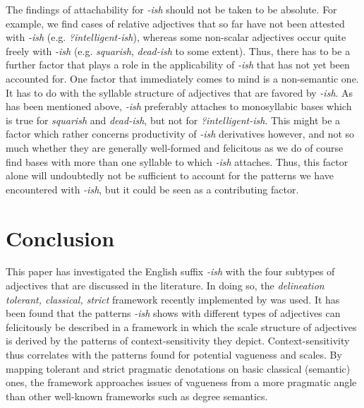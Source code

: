 \documentclass[output=paper]{langsci/langscibook}
\begin{document}
The findings of attachability for \textit{-ish} should not be taken to be absolute. For example, we find cases of relative adjectives that so far have not been attested with \textit{-ish} (e.g. \textit{?intelligent-ish}), whereas some non-scalar adjectives occur quite freely with \textit{-ish} (e.g. \textit{squarish}, \textit{dead-ish} to some extent). Thus, there has to be a further factor that plays a role in the applicability of \textit{-ish} that has not yet been accounted for. One factor that immediately comes to mind is a non-semantic one. It has to do with the syllable structure of adjectives that are favored by \textit{-ish}. As has been mentioned above, \textit{-ish} preferably attaches to monosyllabic bases which is true for \textit{squarish} and \textit{dead-ish}, but not for \textit{?intelligent-ish}. This might be a factor which rather concerns productivity of \textit{-ish} derivatives however, and not so much whether they are generally well-formed and felicitous as we do of course find bases with more than one syllable to which \textit{-ish} attaches. Thus, this factor alone will undoubtedly not be sufficient to account for the patterns we have encountered with \textit{-ish}, but it could be seen as a contributing factor.

\section{Conclusion}
\label{sec:summary}

This paper has investigated the English suffix \textit{-ish} with the four subtypes of adjectives that are discussed in the literature. In doing so, the \textit{delineation tolerant, classical, strict} framework recently implemented by \citet{Burnett2017} was used. It has been found that the patterns \textit{-ish} shows with different types of adjectives can felicitously be described in a framework in which the scale structure of adjectives is derived by the patterns of context-sensitivity they depict. Context-sensitivity thus correlates with the patterns found for potential vagueness and scales. By mapping tolerant and strict pragmatic denotations on basic classical (semantic) ones, the framework approaches issues of vagueness from a more pragmatic angle than other well-known frameworks such as degree semantics.
\end{document}

